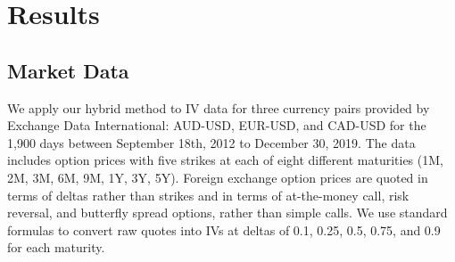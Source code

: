 \documentclass[onefignum,onetabnum]{siamonline190516}
\begin{document}



\section{Results}
\label{sec:results}

\subsection{Market Data}
\label{market}



We apply our hybrid method to IV data for three currency pairs provided by Exchange Data International: AUD-USD, EUR-USD, and CAD-USD  for the 1,900 days between September 18th, 2012 to December 30, 2019.  The data includes option prices with five strikes at each of eight different maturities (1M, 2M, 3M, 6M, 9M, 1Y, 3Y, 5Y).  Foreign exchange option prices are quoted in terms of deltas rather than strikes and in terms of  at-the-money call, risk reversal, and butterfly spread options, rather than simple calls. We use standard formulas \cite{reiswich2012fx} to convert raw quotes into IVs at deltas of 0.1, 0.25, 0.5, 0.75, and 0.9 for each  maturity.
\end{document}
